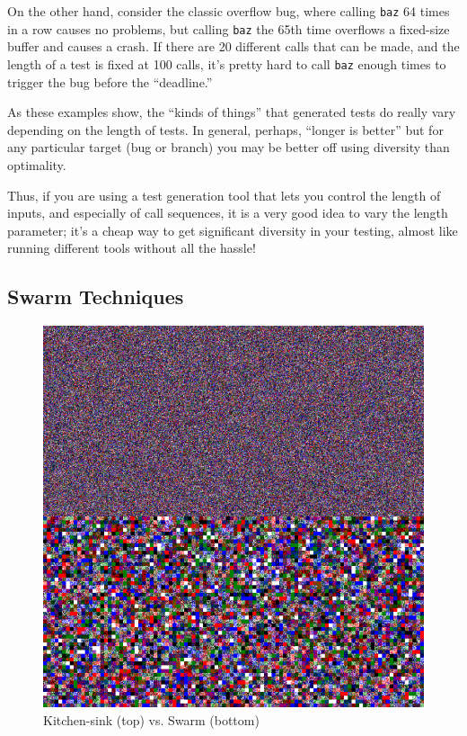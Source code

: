 \documentclass[sigplan,screen]{acmart}
\begin{document}
On the other hand, consider the classic overflow bug, where calling
{\tt baz} 64 times in a row causes no problems, but calling {\tt baz}
the 65th time overflows a fixed-size buffer and causes a crash.  If
there are 20 different calls that can be made, and the length of a
test is fixed at 100 calls, it's pretty hard to call {\tt baz} enough
times to trigger the bug before the ``deadline.''

As these examples show, the ``kinds of things'' that generated tests
do really vary depending on the length of tests.  In general, perhaps,
``longer is better'' \cite{ArcuriLen} but for any particular target
(bug or branch) you may be better off using diversity than optimality.

Thus, if you are using a test generation tool that lets you control
the length of inputs, and especially of call sequences, it is a very
good idea to vary the length parameter; it's a cheap way to get
significant diversity in your testing, almost like running different
tools without all the hassle!

\subsection{Swarm Techniques}

\begin{figure}
\vspace{2mm}
  \centering
  \includegraphics[width=0.9\columnwidth]{swarm.png}
  \caption{Kitchen-sink (top) vs. Swarm (bottom)}
  \label{fig:swarmcol}
\end{figure}
\end{document}
